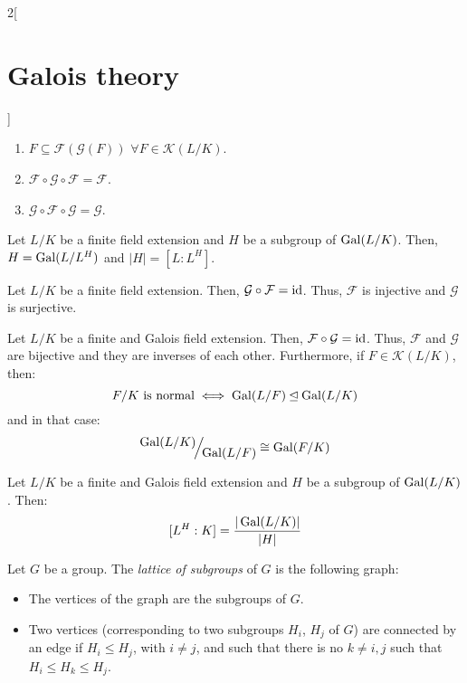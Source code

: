 \documentclass[../../../main.tex]{subfiles}
\begin{document}
\begin{multicols}{2}[\section{Galois theory}]
\begin{prop}
\begin{enumerate}
      \item $F\subseteq \mathcal{F}(\mathcal{G}(F))$ $\forall F\in \mathcal{K}(L/K)$.
      \item $\mathcal{F}\circ\mathcal{G}\circ\mathcal{F}=\mathcal{F}$.
      \item $\mathcal{G}\circ\mathcal{F}\circ\mathcal{G}=\mathcal{G}$.
    \end{enumerate}
  \end{prop}
  \begin{lemma}
    Let $L/K$ be a finite field extension and $H$ be a subgroup of $\operatorname{Gal}(L/K)$. Then, $H=\operatorname{Gal}(L/L^H)$ and $|H|=[L:L^H]$.
  \end{lemma}
  \begin{corollary}
    Let $L/K$ be a finite field extension. Then, $\mathcal{G}\circ\mathcal{F}=\mathrm{id}$. Thus, $\mathcal{F}$ is injective and $\mathcal{G}$ is surjective.
  \end{corollary}
  \begin{theorem}
    Let $L/K$ be a finite and Galois field extension. Then, $\mathcal{F}\circ\mathcal{G}=\mathrm{id}$. Thus, $\mathcal{F}$ and $\mathcal{G}$ are bijective and they are inverses of each other. Furthermore, if $F\in\mathcal{K}(L/K)$, then: $$F/K\text{ is normal}\iff\operatorname{Gal}(L/F)\unlhd\operatorname{Gal}(L/K)$$ and in that case: $$\quot{\Gal(L/K)}{\Gal(L/F)}\cong\Gal(F/K)$$
  \end{theorem}
  \begin{corollary}
    Let $L/K$ be a finite and Galois field extension and $H$ be a subgroup of $\operatorname{Gal}(L/K)$. Then: $$[L^H:K]=\frac{|\operatorname{Gal}(L/K)|}{|H|}$$
  \end{corollary}
  \begin{definition}
    Let $G$ be a group. The \emph{lattice of subgroups} of $G$ is the following graph:
    \begin{itemize}
      \item The vertices of the graph are the subgroups of $G$.
      \item Two vertices (corresponding to two subgroups $H_i$, $H_j$ of $G$) are connected by an edge if $H_i\leq H_j$, with $i\ne j$, and such that there is no $k\ne i,j$ such that $H_i\leq H_k\leq H_j$.
    \end{itemize}
  \end{definition}
  \begin{center}
    \begin{minipage}{\linewidth}
      \centering
      

\end{minipage}
\end{center}
\end{multicols}
\end{document}
